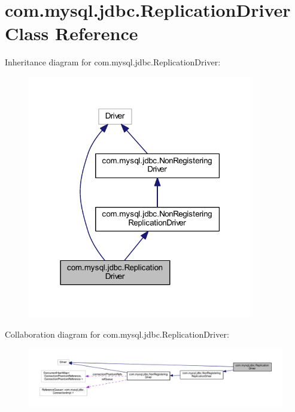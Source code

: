 \hypertarget{classcom_1_1mysql_1_1jdbc_1_1_replication_driver}{}\section{com.\+mysql.\+jdbc.\+Replication\+Driver Class Reference}
\label{classcom_1_1mysql_1_1jdbc_1_1_replication_driver}


Inheritance diagram for com.\+mysql.\+jdbc.\+Replication\+Driver\+:
\nopagebreak
\begin{figure}[H]
\begin{center}
\leavevmode
\includegraphics[width=279pt]{classcom_1_1mysql_1_1jdbc_1_1_replication_driver__inherit__graph}
\end{center}
\end{figure}


Collaboration diagram for com.\+mysql.\+jdbc.\+Replication\+Driver\+:
\nopagebreak
\begin{figure}[H]
\begin{center}
\leavevmode
\includegraphics[width=350pt]{classcom_1_1mysql_1_1jdbc_1_1_replication_driver__coll__graph}
\end{center}
\end{figure}
